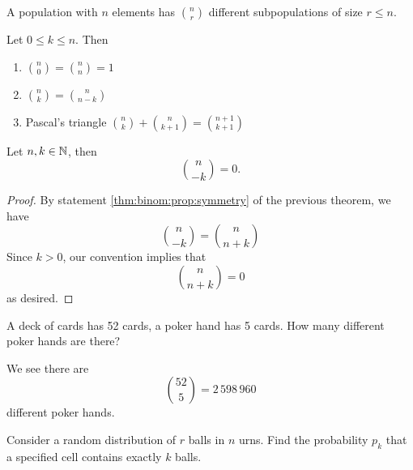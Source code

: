 A population with $n$ elements has $\binom{n}{r}$ different
subpopulations of size $r\leq n$.

Let $0\leq k\leq n$. Then
\begin{enumerate}
\item $\displaystyle\binom{n}{0}=\binom{n}{n}=1$
\item\label{thm:binom:prop:symmetry} $\displaystyle\binom{n}{k}=\binom{n}{n-k}$
\item Pascal's triangle $\displaystyle\binom{n}{k}+\binom{n}{k+1}=\binom{n+1}{k+1}$
\end{enumerate}

\begin{cor}
Let $n,k\in\mathbb{N}$, then
\begin{equation}
\binom{n}{-k}=0.
\end{equation}
\end{cor}
\begin{proof}
By statement \ref{thm:binom:prop:symmetry} of the previous theorem, we
have
\begin{equation}
\binom{n}{-k}=\binom{n}{n+k}
\end{equation}
Since $k>0$, our convention implies that
\begin{equation}
\binom{n}{n+k}=0
\end{equation}
as desired.
\end{proof}



A deck of cards has 52 cards, a poker hand has 5 cards.
How many different poker hands are there?

We see there are
\begin{equation}
\binom{52}{5}=2\,598\,960
\end{equation}
different poker hands.

Consider a random distribution of $r$ balls in $n$ urns. Find the
probability $p_{k}$ that a specified cell contains exactly $k$ balls.

